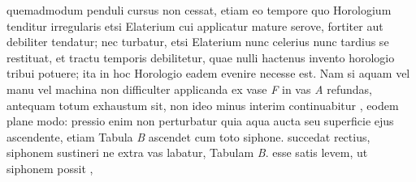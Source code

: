              quemadmodum penduli\protect{} cursus non cessat, etiam eo tempore quo Horologium\protect{} tenditur  irregularis etsi Elaterium\protect{} cui applicatur mature serove,  fortiter aut debiliter tendatur; nec turbatur, etsi Elaterium\protect{} nunc celerius nunc tardius se restituat, et tractu temporis debilitetur, quae  nulli hactenus invento horologio\protect{} tribui potuere; ita in hoc Horologio\protect{} eadem evenire necesse est. Nam si aquam vel manu vel machina non difficulter applicanda ex vase \textit{F} in vas \textit{A} refundas, antequam totum exhaustum sit,  non ideo minus interim continuabitur , eodem plane modo: pressio enim non perturbatur quia aqua  aucta seu superficie ejus ascendente, etiam Tabula \textit{B} ascendet cum toto siphone\protect{}.  succedat rectius,  siphonem\protect{} sustineri ne extra vas labatur, Tabulam \textit{B}. esse satis levem, ut siphonem\protect{} possit , 